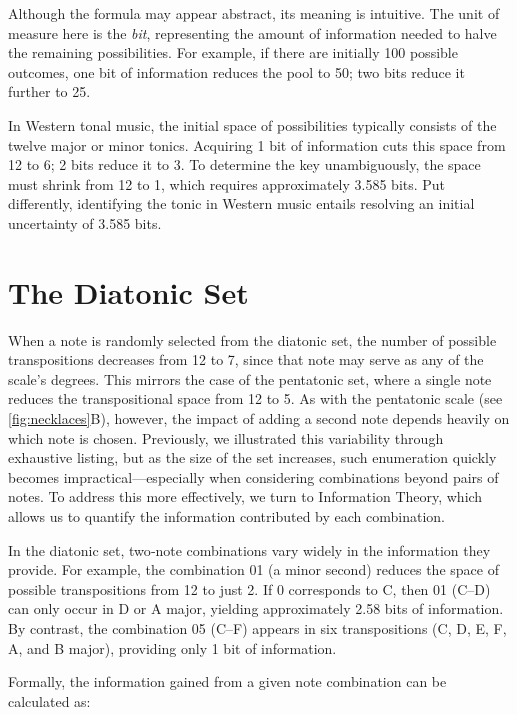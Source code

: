 \documentclass[10pt,twocolumn]{article}
\numberwithin{equation}{section} %
\begin{document}
Although the formula may appear abstract, its meaning is intuitive. The unit of measure here
is the \textit{bit}, representing the amount of information needed to halve the
remaining possibilities. For example, if there are initially 100 possible outcomes, one bit of information reduces the pool to 50; two bits reduce it further to 25.

In Western tonal music, the initial space of possibilities typically consists of the
twelve major or minor tonics. Acquiring 1 bit of information cuts this space
from 12 to 6; 2 bits reduce it to 3. To determine the key unambiguously, the
space must shrink from 12 to 1, which requires approximately 3.585 bits. Put
differently, identifying the tonic in Western music entails resolving an
initial uncertainty of 3.585 bits.

\section{The Diatonic Set}

When a note is
randomly selected from the diatonic set, the number of possible transpositions
decreases from 12 to 7, since that note may serve as any of the scale’s
degrees. This mirrors the case of the pentatonic set, where a single note
reduces the transpositional space from 12 to 5. As with the pentatonic scale
(see \autoref{fig:necklaces}B), however, the impact of adding a
second note depends heavily on which note is chosen. Previously, we illustrated
this variability through exhaustive listing, but as the size of the set
increases, such enumeration quickly becomes impractical—especially when
considering combinations beyond pairs of notes. To address this more
effectively, we turn to Information Theory, which allows us to quantify the
information contributed by each combination.

In the diatonic
set, two‑note combinations vary widely in the information they provide. For
example, the combination 01 (a minor second) reduces the space of possible
transpositions from 12 to just 2. If 0 corresponds to C, then 01 (C–D\text{$\flat$}) can only occur in D\text{$\flat$} or A\text{$\flat$} major, yielding approximately 2.58 bits
of information. By contrast, the combination 05 (C–F) appears in six
transpositions (C, D\text{$\flat$}, E\text{$\flat$}, F, A\text{$\flat$}, and B\text{$\flat$} major), providing only 1 bit of information.

Formally, the information gained from a given note combination can be calculated as:
\end{document}
